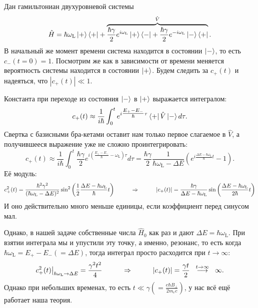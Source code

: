 Дан гамильтониан двухуровневой системы
\begin{equation*}
	\hat{H} = \hbar \omega_\text{L} \left| + \right\rangle \left\langle + \right| + \overbrace{\frac{\hbar \gamma}{2} e^{i \omega_\text{L}} \left| + \right\rangle \left\langle - \right| + \frac{\hbar \gamma}{2}  e^{-i \omega_\text{L}} \left| - \right\rangle \left\langle + \right|}^{\hat{V}}.
\end{equation*}
В начальный же момент времени система находится в состоянии $\left| - \right\rangle$, то есть $c_{-}(t = 0) = 1$. Посмотрим же как в зависимости от времени меняется вероятность системы находится в состоянии $\left| + \right\rangle$. Будем следить за $c_{+}(t)$ и надеяться, что $|c_{+}(t)|\ll 1$.

Константа при переходе из состояния $\left| - \right\rangle$ в $\left| + \right\rangle$ выражается интегралом:
\begin{equation*}
	c_{+} (t) \approx \frac{1}{i \hbar} \int_{0}^{t} e^{i\tfrac{E_+ - E_-}{\hbar}\tau} \left\langle + \right| \hat{V} \left| - \right\rangle d \tau.
\end{equation*}
Свертка с базисными бра-кетами оставит нам только первое слагаемое в $\hat{V}$, а получившееся выражение уже не сложно проинтегрировать:
\begin{equation*}
	c_{+} (t) \approx \frac{1}{i \hbar} \int_{0}^{t} \frac{\hbar \gamma}{2} e^{i\left(\frac{E_+ - E_-}{\hbar}- \omega_\text{L}\right)\tau} d \tau
	=
	\frac{\hbar \gamma}{2} \frac{1}{\hbar\omega_\text{L} - \Delta E} \left(e^{i \frac{\Delta E - \hbar \omega_\text{L}}{\hbar}t} - 1\right).
\end{equation*}
Её модуль:
\begin{equation*}
	c_+^2(t) = \frac{\hbar^2 \gamma^2}{(\hbar\omega_\text{L} - \Delta E)^2} \sin^2 \left(\frac{1}{2} \frac{\Delta E - \hbar \omega_\text{L}}{\hbar} t\right)
	\hspace{1 cm}
	\Rightarrow
	\hspace{1 cm}
	|c_+(t)| = \frac{\hbar \gamma}{\Delta E -\hbar\omega_\text{L}} \sin \left(\frac{\Delta E - \hbar \omega_\text{L}}{2\hbar} t\right)
\end{equation*}
И оно действительно много меньше единицы, если коэффициент перед синусом мал.

Однако, в нашей задаче собственные числа $\hat{H}_0$ как раз и дают $\Delta E = \hbar \omega_\text{L}$. При взятии интеграла мы и упустили эту точку, а именно, резонанс, то есть когда $\hbar\omega_\text{L} = E_+ - E_- (= \Delta E)$, тогда интеграл просто расходится при $t \to \infty$:
\begin{equation*}
	c_+^2(t)\big|_{\hbar \omega_\text{L} \to \Delta E} = \frac{\gamma^2 t^2}{4}
	\hspace{1 cm}
	\Rightarrow
	\hspace{1 cm}
	|c_+(t)| = \frac{\gamma t}{2} 
	\hspace{0.2 cm}
	\overset{t \to \infty}{\longrightarrow} 
	\hspace{0.2 cm}
	\infty.
\end{equation*}
Однако при небольших временах, то есть $t \ll \gamma \left(= \frac{e \hbar B_\bot}{2 m_e c}\right)$, у нас всё ещё работает наша теория.